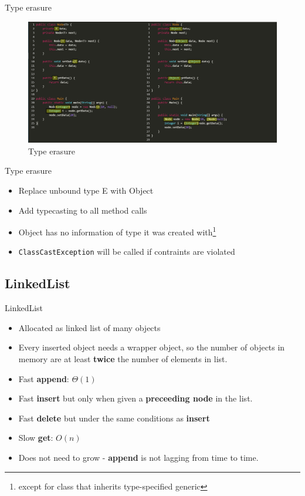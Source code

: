 \documentclass{beamer}
\begin{document}
\begin{frame}{Type erasure}
    \begin{figure}[htbp]
        \centering
        \includegraphics[width=1.00\textwidth]{type_erasure.png}
        \caption{Type erasure}
        \label{fig:type-erasure}
    \end{figure}
\end{frame}

\begin{frame}{Type erasure}
    \begin{itemize}
        \item Replace unbound type E with Object
        \item Add typecasting to all method calls
        \item Object has no information of type it was created with\footnote{except for class that inherits type-specified generic}
        \item \texttt{ClassCastException} will be called if contraints are violated
    \end{itemize}
\end{frame}

\subsection{LinkedList}

\begin{frame}{LinkedList}

\begin{itemize}
\item Allocated as linked list of many objects
\item Every inserted object needs a wrapper object, so the number of objects in memory are at least \textbf{twice} the number of elements in list.
\item Fast \textbf{append}: $\Theta(1)$
\item Fast \textbf{insert} but only when given a \textbf{preceeding node} in the list.
\item Fast \textbf{delete} but under the same conditions as \textbf{insert}
\item Slow \textbf{get}: $O(n)$
\item Does not need to grow - \textbf{append} is not lagging from time to time.
\end{itemize}

\end{frame}
\end{document}
